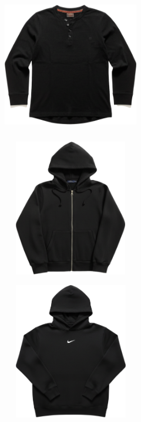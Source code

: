 \documentclass[10pt]{article}
\begin{document}
\vspace*{6.00mm}\
\begin{minipage}[c][59.33mm][c]{59.33mm}\centering
\includegraphics[width=59.33mm,height=59.33mm,keepaspectratio]{assets/midlayer/black-half-button-long-sleeve.png}\
\end{minipage} \hspace*{6.00mm} \begin{minipage}[c][59.33mm][c]{59.33mm}\centering
\includegraphics[width=59.33mm,height=59.33mm,keepaspectratio]{assets/midlayer/black-hoodie-zip.png}\
\end{minipage} \hspace*{6.00mm} \begin{minipage}[c][59.33mm][c]{59.33mm}\centering
\includegraphics[width=59.33mm,height=59.33mm,keepaspectratio]{assets/midlayer/black-nike-hoodie.png}\
\end{minipage}\
\newpage
\end{document}
